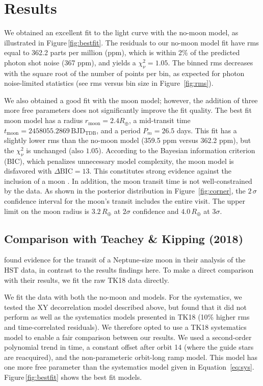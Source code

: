 \documentclass[twocolumn]{aastex62}
\begin{document}
\section{Results}
We obtained an excellent fit to the light curve with the no-moon model, as illustrated in  Figure\,\ref{fig:bestfit}. The residuals to our no-moon model fit have rms equal to 362.2 parts per million (ppm), which is within 2\% of the predicted photon shot noise (367 ppm), and yields a $\chi_\nu^2 = 1.05$. The binned rms decreases with the square root of the number of points per bin, as expected for photon noise-limited statistics (see rms versus bin size in Figure~\ref{fig:rms}).

We also obtained a good fit with the moon model; however, the addition of three more free parameters does not significantly improve the fit quality. The best fit moon model has a radius $r_\mathrm{moon} = 2.4R_\oplus$, a mid-transit time $t_\mathrm{moon} = 2458055.2869\,\mathrm{BJD_{TDB}}$, and a period $P_m = 26.5$ days. This fit has a slightly lower rms than the no-moon model (359.5 ppm versus 362.2 ppm), but the $\chi_\nu^2$ is unchanged (also $1.05$). According to the Bayesian information criterion (BIC), which penalizes unnecessary model complexity, the moon model is disfavored with $\Delta\mathrm{BIC} = 13$. This constitutes strong evidence against the inclusion of a moon \citep{kass95}.  In addition, the moon transit time is not well-constrained by the data. As shown in the posterior distribution in Figure~\ref{fig:corner}, the $2\,\sigma$ confidence interval for the moon's transit includes the entire visit.  The upper limit on the moon radius is $3.2\,R_\oplus$ at $2\sigma$ confidence and $4.0\,R_\oplus$ at $3\sigma$.

\subsection{Comparison with Teachey \& Kipping (2018)}
\cite{teachey18b} found evidence for the transit of a Neptune-size moon in their analysis of the HST data, in contrast to the results findings here.  To make a direct comparison with their results, we fit the raw TK18 data directly. 

We fit the data with both the no-moon and models.  For the systematics, we tested the XY decorrelation model described above, but found that it did not perform as well as the systematics models presented in TK18 (10\% higher rms and time-correlated residuals).  We therefore opted to use a TK18 systematics model to enable a fair comparison between our results. We used a second-order polynomial trend in time, a constant offset after orbit 14 (where the guide stars are reacquired), and the non-parameteric orbit-long ramp model. This model has one more free parameter than the systematics model given in Equation~\ref{eq:sys}. Figure\,\ref{fig:bestfit} shows the best fit models.
\end{document}
